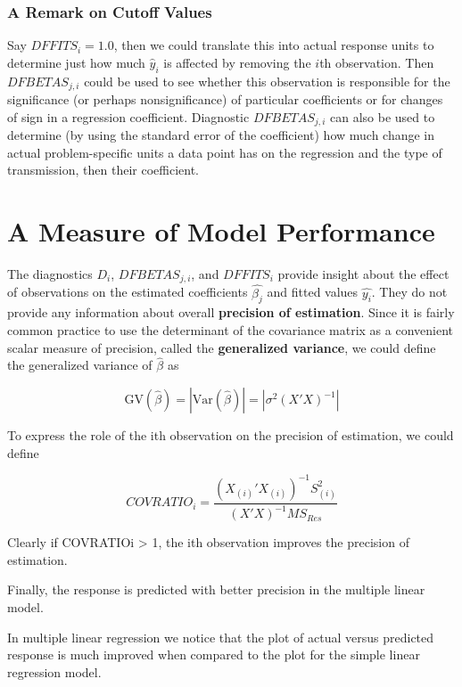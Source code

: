 \documentclass[12pt]{article}
\begin{document}
\subsubsection*{A Remark on Cutoff Values} 

Say $DFFITS_i = 1.0$, then we could translate this into actual response units to determine just how much $\hat{y}_i$ is affected by removing the $i$th observation. Then $DFBETAS_{j,i}$ could be used to see whether this observation is responsible for the significance (or perhaps nonsignificance) of particular coefficients or for changes of sign in a regression coefficient. Diagnostic $DFBETAS_{j,i}$ can also be used to determine (by using the standard error of the coefficient) how much change in actual problem-specific units a data point has on the regression and the type of transmission, then their coefficient.


\section{A Measure of Model Performance}

The diagnostics $D_i$, $DFBETAS_{j,i}$, and $DFFITS_i$ provide insight about the effect of observations on the estimated coefficients $\hat{\beta_j}$ and fitted values $\hat{y_i}$. They do not provide any information about overall \textbf{precision of estimation}. Since it is fairly common practice to use the determinant of the covariance matrix as a convenient scalar measure of precision, called the \textbf{generalized variance}, we could define the generalized variance of $\hat{\beta}$ as 

$$
\mathrm{GV}(\hat{\beta}) = | \mathrm{Var} (\hat{\beta}) | = | \sigma^2 (X'X)^{-1} |
$$

To express the role of the ith observation on the precision of
estimation, we could define


$$
COVRATIO_i = \frac{(X_{(i)}'X_{(i)})^{-1} S_{(i)}^2}{(X'X)^{-1} MS_{Res}}
$$

Clearly if COVRATIOi > 1, the ith observation improves the precision of estimation.


Finally, the response is predicted with better precision in the multiple linear model. 

In multiple linear regression we notice that the plot of actual versus predicted response is much improved when compared to the plot for the simple linear regression model. 
\end{document}
